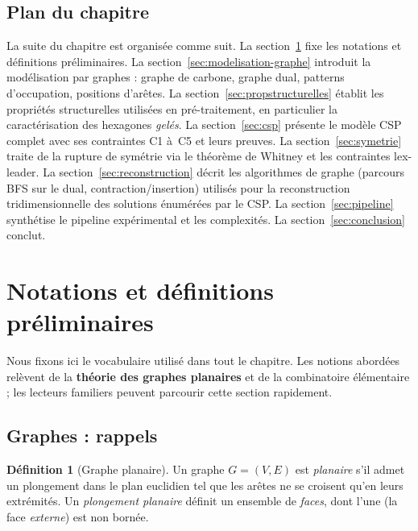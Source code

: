 \documentclass[12pt,a4paper]{article}
\theoremstyle{definition}
\newtheorem{definition}{D\'efinition}[section]
\theoremstyle{remark}
\begin{document}
\subsection{Plan du chapitre}

La suite du chapitre est organis\'ee comme suit. La
section~\ref{sec:notations} fixe les notations et d\'efinitions
pr\'eliminaires. La section~\ref{sec:modelisation-graphe} introduit la
mod\'elisation par graphes : graphe de carbone, graphe dual, patterns
d'occupation, positions d'ar\^etes. La section~\ref{sec:propstructurelles}
\'etablit les propri\'et\'es structurelles utilis\'ees en pr\'e-traitement,
en particulier la caract\'erisation des hexagones \emph{gel\'es}. La
section~\ref{sec:csp} pr\'esente le mod\`ele CSP complet avec ses
contraintes C1 \`a~C5 et leurs preuves. La section~\ref{sec:symetrie}
traite de la rupture de sym\'etrie via le th\'eor\`eme de Whitney et les
contraintes lex-leader. La section~\ref{sec:reconstruction} d\'ecrit les
algorithmes de graphe (parcours BFS sur le dual, contraction/insertion)
utilis\'es pour la reconstruction tridimensionnelle des solutions
\'enum\'er\'ees par le CSP. La section~\ref{sec:pipeline} synth\'etise le
pipeline exp\'erimental et les complexit\'es. La
section~\ref{sec:conclusion} conclut.

\section{Notations et d\'efinitions pr\'eliminaires}
\label{sec:notations}

Nous fixons ici le vocabulaire utilis\'e dans tout le chapitre. Les notions
abord\'ees rel\`event de la \textbf{th\'eorie des graphes planaires} et
de la combinatoire \'el\'ementaire ; les lecteurs familiers peuvent
parcourir cette section rapidement.

\subsection{Graphes : rappels}

\begin{definition}[Graphe planaire]
Un graphe $G = (V, E)$ est \emph{planaire} s'il admet un plongement dans
le plan euclidien tel que les ar\^etes ne se croisent qu'en leurs
extr\'emit\'es. Un \emph{plongement planaire} d\'efinit un ensemble de
\emph{faces}, dont l'une (la face \emph{externe}) est non born\'ee.
\end{definition}
\end{document}
